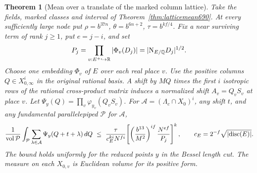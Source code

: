 \documentclass[a4paper,11pt]{article}
\newtheorem{theorem}[proposition]{Theorem}
\theoremstyle{definition}
\theoremstyle{remark}
\numberwithin{equation}{section}
\begin{document}
\begin{theorem}[Mean over a translate of the marked column lattice]
\leavevmode\label{thm:schurmean692}
Take the fields, marked classes and interval of
Theorem~\ref{thm:latticemean690}. At every sufficiently large
node put \(\rho=b^{37n}\), \(\theta=b^{6n+2}\),
\(\tau=b^{kf/4}\). Fix a near surviving term of rank \(j\ge1\),
put \(e=j-i\), and set
\[
        P_j=\prod_{v:E^+\hookrightarrow\mathbb R}
                     |\Phi_v(D_j)|
             =|{\rm N}_{E/\mathbb Q}D_j|^{1/2}.
\]
Choose one embedding \(\Phi_v\) of \(E\) over each real place \(v\).
Use the positive columns \(Q\in X_{0,\infty}^i\) in the
original rational basis. A shift by \(M Q\) times the first
\(i\) isotropic rows of the rational cross-product matrix
induces a normalized shift \(A_v=Q_v S_v\) at place \(v\).
Let \(\Psi_y(Q)=\prod_v\varphi_{y_v}(Q_vS_v)\).
For \(\mathcal A=(\Lambda_c\cap X_0)^i\), any shift \(t\), and
any fundamental parallelepiped \(\mathcal P\) for \(\mathcal A\),
\[
 \frac{1}{\operatorname{vol}\mathcal P}
 \int_{\mathcal P}\sum_{\lambda\in\mathcal A}
                         \Psi_y(Q+t+\lambda)\,dQ
 \ \le\
 \frac{\tau}{c_E^{ki}N^{fi}}\!
 \left[\left(\frac{b^{13}}{M^2}\right)^{if}
                           \frac{N^{ef}}{P_j}\right]^k ,
 \qquad c_E=2^{-f}\sqrt{|{\rm disc}(E)|}.
\]
The bound holds uniformly for the reduced points \(y\) in the
Bessel length cut. The measure on each \(X_{0,v}\) is Euclidean
volume for its positive form.
\end{theorem}
\end{document}
